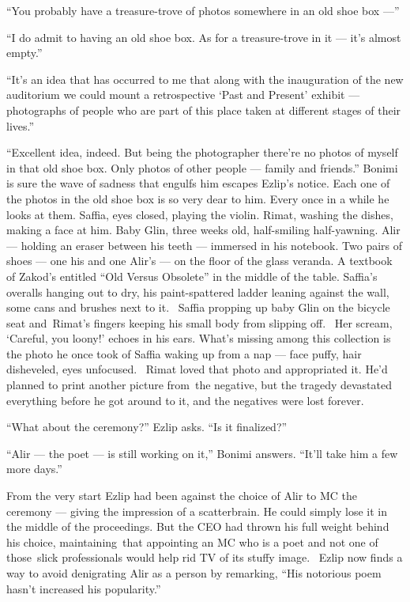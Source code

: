 \documentclass[twoside,11pt,openany]{book}
\begin{document}
``You probably have a treasure-trove of photos somewhere in an old shoe box ---''

``I do admit to having an old shoe box. As for a treasure-trove in it --- it's almost
empty.''

``It's an idea that has occurred to me that along with the inauguration of the new auditorium we could
mount a retrospective `Past and Present' exhibit --- photographs of people who are part of this place taken at
different stages of their lives.''

``Excellent idea, indeed. But being the photographer there're no photos of myself in that old shoe box.
Only photos of other people --- family and friends.'' Bonimi is sure the wave of sadness that engulfs him
escapes Ezlip's notice.  Each one of the photos in the old shoe box is so very dear to him. Every once in a while he
looks at them. Saffia, eyes closed, playing the violin. Rimat, washing the dishes, making a face at him. Baby Glin,
three weeks old, half-smiling half-yawning. Alir --- holding an eraser between his teeth --- immersed in his notebook. Two
pairs of shoes --- one his and one Alir's --- on the floor of the glass veranda. A textbook of Zakod's entitled
``Old Versus Obsolete'' in the middle of the table. Saffia's overalls hanging out to dry, his
paint-spattered ladder leaning against the wall, some cans and brushes next to it. ~Saffia propping up baby Glin on the
bicycle seat and~Rimat's fingers keeping his small body from slipping off. ~Her scream, `Careful, you loony!' echoes in
his ears. What's missing among this collection is the photo he once took of Saffia waking up from a nap --- face puffy,
hair disheveled,{ }{eyes
unfocused.} ~Rimat loved that photo and appropriated it. He'd planned to print another picture from~the negative, but
the tragedy devastated everything before he got around to it, and the negatives were lost forever.

``What about the ceremony?'' Ezlip asks. ``Is it finalized?''

``Alir --- the poet --- is still working on it,'' Bonimi answers. ``It'll take him a
few more days.''

From the very start Ezlip had been against the choice of Alir to MC the ceremony --- giving the impression of a
scatterbrain. He could simply lose it in the middle of the proceedings. But the CEO had thrown his full weight behind
his choice, maintaining~that appointing an MC who is a poet and not one of those~slick professionals would help rid TV
of its stuffy image.{ }~Ezlip now finds a way to avoid denigrating Alir as a person by remarking,
``His notorious poem hasn't increased his popularity.''
\end{document}
